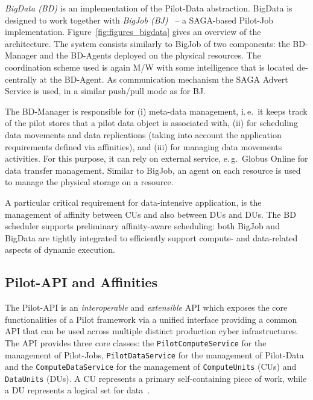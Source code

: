 \documentclass{acm_proc_article-sp}
\newcommand{\pilot}{Pilot\xspace}
\begin{document}
{\it BigData (BD)} is an implementation of the Pilot-Data abstraction. BigData
is designed to work together with \emph{BigJob (BJ)}~\cite{bigjob_web} -- a
SAGA-based Pilot-Job implementation. Figure~\ref{fig:figures_bigdata} gives an
overview of the architecture. The system consists similarly to BigJob of two
components: the BD-Manager and the BD-Agents deployed on the physical resources.
The coordination scheme used is again M/W with some intelligence that is located
de-centrally at the BD-Agent. As communication mechanism the SAGA Advert Service
is used, in a similar push/pull mode as for BJ.

The BD-Manager is responsible for (i) meta-data management, i.\,e.\ it
keeps track of the pilot stores that a pilot data object is associated
with, (ii) for scheduling data movements and data replications (taking
into account the application requirements defined via affinities), and
(iii) for managing data movements activities. For this purpose, it can rely
on external service, e.\,g.\ Globus Online for data transfer management.  
Similar to BigJob, an agent on each resource is used to manage the physical 
storage on a resource.  

A particular critical requirement for data-intensive application, is
the management of affinity between CUs and also between DUs and
DUs. The BD scheduler supports preliminary affinity-aware
scheduling: both BigJob and BigData are tightly integrated to
efficiently support compute- and data-related aspects of dynamic
execution. 

\subsection{Pilot-API and Affinities}
\label{sec-affinities}

The Pilot-API is an {\it interoperable} and {\it extensible} API which exposes the core functionalities
of a \pilot framework via a unified interface providing a common API that can be used across multiple 
distinct production cyber infrastructures.
 The API provides three core classes: the
\texttt{PilotComputeService} for the management of Pilot-Jobs,
\texttt{PilotDataService} for the management of Pilot-Data and the
\texttt{ComputeDataService} for the management of \texttt{ComputeUnits} (CUs)
and \texttt{DataUnits} (DUs). A CU represents a primary self-containing piece
of work, while a DU represents a logical set for data~\cite{pstar-2012}.

\end{document}
